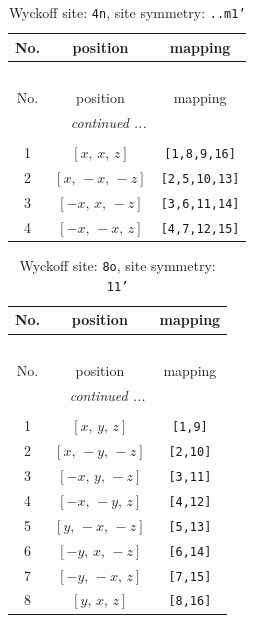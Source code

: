 \documentclass[fleqn,8pt]{jsarticle}
\begin{document}
\renewcommand{\arraystretch}{1.2}
\begin{longtable}{ccc}
\caption{Wyckoff site: {\tt 4n}, site symmetry: {\tt ..m1'}}
 \\
 \hline \hline
No. & position & mapping \\ \hline \endfirsthead

\multicolumn{2}{l}{\tablename\ \thetable{}} \\
 \hline \hline
No. & position & mapping \\ \hline \endhead

 \hline \hline
\multicolumn{2}{r}{\footnotesize\it continued ...} \\ \endfoot

 \hline \hline
\multicolumn{2}{r}{} \\ \endlastfoot

1 & $\left[ x,\, x,\, z \right]$ & {\tt [1,8,9,16]} \\ \hline
2 & $\left[ x,\, - x,\, - z \right]$ & {\tt [2,5,10,13]} \\ \hline
3 & $\left[ - x,\, x,\, - z \right]$ & {\tt [3,6,11,14]} \\ \hline
4 & $\left[ - x,\, - x,\, z \right]$ & {\tt [4,7,12,15]} \\
\end{longtable}
\renewcommand{\arraystretch}{1.2}
\begin{longtable}{ccc}
\caption{Wyckoff site: {\tt 8o}, site symmetry: {\tt 11'}}
 \\
 \hline \hline
No. & position & mapping \\ \hline \endfirsthead

\multicolumn{2}{l}{\tablename\ \thetable{}} \\
 \hline \hline
No. & position & mapping \\ \hline \endhead

 \hline \hline
\multicolumn{2}{r}{\footnotesize\it continued ...} \\ \endfoot

 \hline \hline
\multicolumn{2}{r}{} \\ \endlastfoot

1 & $\left[ x,\, y,\, z \right]$ & {\tt [1,9]} \\ \hline
2 & $\left[ x,\, - y,\, - z \right]$ & {\tt [2,10]} \\ \hline
3 & $\left[ - x,\, y,\, - z \right]$ & {\tt [3,11]} \\ \hline
4 & $\left[ - x,\, - y,\, z \right]$ & {\tt [4,12]} \\ \hline
5 & $\left[ y,\, - x,\, - z \right]$ & {\tt [5,13]} \\ \hline
6 & $\left[ - y,\, x,\, - z \right]$ & {\tt [6,14]} \\ \hline
7 & $\left[ - y,\, - x,\, z \right]$ & {\tt [7,15]} \\ \hline
8 & $\left[ y,\, x,\, z \right]$ & {\tt [8,16]} \\
\end{longtable}
\end{document}
